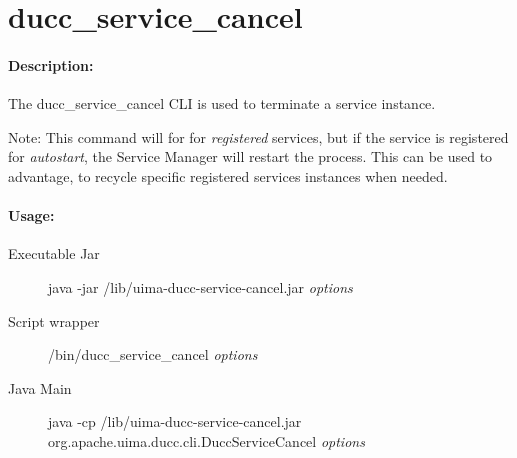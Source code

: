 % 
% 
% 
% 
\ifpdf
\else
{}
\fi
    \section{ducc\_service\_cancel}
    \label{sec:cli.service-cancel}
    \paragraph{Description:}

    The ducc\_service\_cancel CLI is used to terminate a service instance.

    Note: This command will for for {\em registered} services, but if the service is registered for
    {\em autostart}, the Service Manager will restart the process.  This can be used to advantage, to
    recycle specific registered services instances when needed.

    \paragraph{Usage:}
    \begin{description}
    \item[Executable Jar] java -jar \ducchome/lib/uima-ducc-service-cancel.jar {\em options}
    \item[Script wrapper] \ducchome/bin/ducc\_service\_cancel {\em options}
    \item[Java Main]      java -cp \ducchome/lib/uima-ducc-service-cancel.jar org.apache.uima.ducc.cli.DuccServiceCancel {\em options}
    \end{description}

